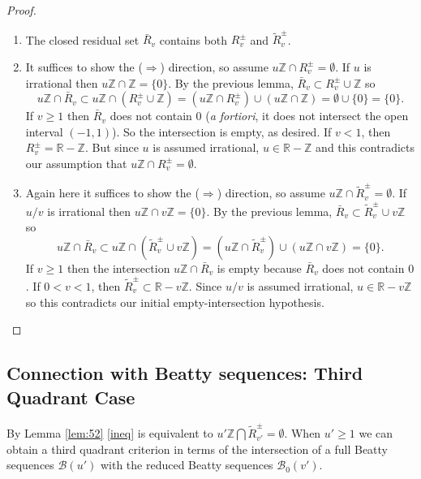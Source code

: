 \documentclass[12pt,letterpaper, reqno]{amsart}
\theoremstyle{definition}
\theoremstyle{remark}
\newcommand{\RR}{\ensuremath{\mathbb{R}}}
\newcommand{\ZZ}{\ensuremath{\mathbb{Z}}}
\newcommand{\uu}{{u'}}
\newcommand{\vv}{{v'}}
\newcommand{\sB}{{\mathcal B}}
\begin{document}
\begin{proof}
\begin{enumerate}
\item The closed residual set $\bar{R}_v$ contains both $R_v^\pm$ and $\widetilde{R}_{v}^\pm$.
\item It suffices to show the ($\Rightarrow$) direction, so assume $u\ZZ\cap R_v^\pm=\emptyset$. 
If $u$ is irrational then $u\ZZ\cap \ZZ = \{0\}$.
By the previous lemma, $\bar{R}_v \subset R_v^\pm \cup \ZZ$ so
\[ u\ZZ\cap \bar{R}_v \subset u\ZZ\cap ( R_v^\pm \cup \ZZ) = (u\ZZ\cap R_v^\pm) \cup (u\ZZ\cap\ZZ) = \emptyset \cup \{0\} = \{ 0\}.\]
If $v\geq 1$ then $ \bar{R}_v$ does not contain $0$ ({\em a fortiori}, it does not intersect the open interval $(-1,1)$). So the intersection is empty, as desired. If $v<1$, then $R_v^\pm = \RR-\ZZ$. But since $u$ is assumed irrational, $u\in \RR-\ZZ$ and this contradicts our assumption that $u\ZZ\cap R_v^\pm=\emptyset$.
\item Again here it suffices to show the ($\Rightarrow$) direction, so assume $u\ZZ\cap \widetilde{R}_{v}^\pm=\emptyset$. If $u/v$ is irrational then $u\ZZ\cap v\ZZ = \{0\}$. By the previous lemma, $\bar{R}_v \subset \widetilde{R}_{v}^\pm \cup v\ZZ$ so
\[ u\ZZ\cap \bar{R}_v \subset u\ZZ\cap ( \widetilde{R}_{v}^\pm \cup v\ZZ) = (u\ZZ\cap \widetilde{R}_{v}^\pm) \cup (u\ZZ\cap v\ZZ) = \{0\} .\]
If $v\geq 1$ then the intersection $ u\ZZ\cap \bar{R}_v$ is empty because $\bar{R}_v$ does not contain $0$. If $0<v<1$, then $\widetilde{R}_{v}^\pm \subset \RR - v\ZZ$. Since $u/v$ is assumed irrational, $u\in \RR - v\ZZ$ so this contradicts our initial empty-intersection hypothesis.
\end{enumerate}
\end{proof}
%
\subsection{Connection with Beatty sequences: Third Quadrant Case }\label{sec:73}

By Lemma \ref{lem:52} \eqref{ineq} is equivalent  to  ${\uu}\ZZ \bigcap \widetilde{R}_\vv^{\pm} = \emptyset$.
 When $\uu \ge 1$ we  can  obtain a third quadrant criterion   in terms of the intersection of a full Beatty sequences $\sB(\uu)$
 with the   reduced Beatty sequences $\sB_0(\vv)$.
\end{document}
